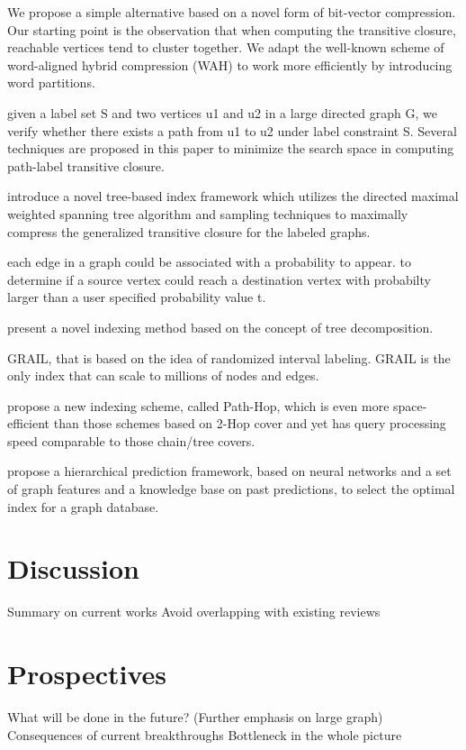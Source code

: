 \documentclass[12pt, conference, compsocconf]{../IEEEtran}
\begin{document}
\citep{1054} We propose a simple alternative based on a novel form of bit-vector compression. Our starting point is the observation that when computing the transitive closure, reachable vertices tend to cluster together. We adapt the well-known scheme of word-aligned hybrid compression (WAH) to work more efficiently by introducing word partitions. 

\citep{1055} given a label set S and two vertices u1 and u2 in a large directed graph G, we verify whether there exists a path from u1 to u2 under label constraint S. Several techniques are proposed in this paper to minimize the search space in computing path-label transitive closure.

\citep{1057} introduce a novel tree-based index framework which utilizes the directed maximal weighted spanning tree algorithm and sampling techniques to maximally compress the generalized transitive closure for the labeled graphs.

\citep{1056} each edge in a graph could be associated with a probability to appear. to determine if a source vertex could reach a destination vertex with probabilty larger than a user specified probability value t.

\citep{1058} present a novel indexing method based on the concept of tree decomposition. 

\citep{1059} GRAIL, that is based on the idea of randomized interval labeling. GRAIL is the only index that can scale to millions of nodes and edges.

\citep{1060} propose a new indexing scheme, called Path-Hop, which is even more space-efficient than those schemes based on 2-Hop cover and yet has query processing speed comparable to those chain/tree covers. 

\citep{1061} propose a hierarchical prediction framework, based on neural networks and a set of graph features and a knowledge base on past predictions, to select the optimal index for a graph database.

\section{Discussion}

Summary on current works
  Avoid overlapping with existing reviews

\section{Prospectives}

What will be done in the future? (Further emphasis on large graph)
  Consequences of current breakthroughs
  Bottleneck in the whole picture



\end{document}
